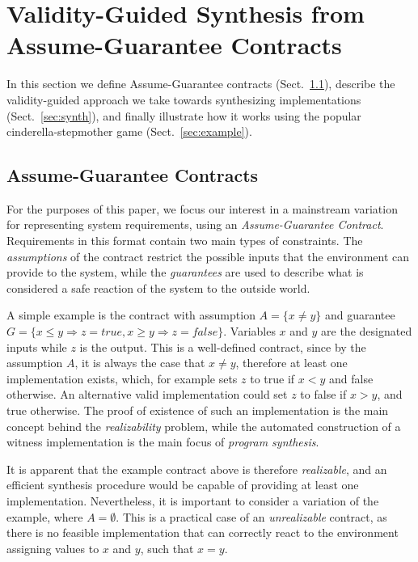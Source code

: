 \section{Validity-Guided Synthesis from Assume-Guarantee Contracts}
\label{sec:synthesis}


In this section we define Assume-Guarantee contracts (Sect.~\ref{sec:pre}),
describe the validity-guided approach we take towards synthesizing
implementations (Sect.~\ref{sec:synth}),
and finally illustrate how it works using the popular cinderella-stepmother
game (Sect.~\ref{sec:example}).

\subsection{Assume-Guarantee Contracts}
\label{sec:pre}

For the purposes of this paper, we focus our interest in a mainstream variation
for representing system requirements, using an \textit{Assume-Guarantee
Contract}. Requirements in this format contain two main types of constraints.
The \emph{assumptions} of the contract restrict the possible inputs that the
environment can provide to the system, while the \emph{guarantees} are used to
describe what is considered a safe reaction of the system to the outside world. 

A simple example is the contract with assumption $A = \{x\neq
y\}$ and guarantee $G = \{x \leq y \Rightarrow z =
\textit{true}, x \geq y \Rightarrow z = \textit{false}\}$. Variables
$x$ and $y$ are the designated inputs while $z$ is the output. This is a
well-defined contract, since by the assumption $A$, it is always the case that
$x \neq y$, therefore at least one implementation exists, which, for example
sets $z$ to true if $x < y$ and false otherwise. An alternative
valid implementation could set $z$ to false if $x > y$, and true otherwise. The
proof of existence of such an implementation is the main concept behind the
\emph{realizability} problem, while the automated construction of a witness
implementation is the main focus of \emph{program synthesis}.


It is apparent that the example contract above is therefore \emph{realizable},
and an efficient synthesis procedure would be capable of providing at least one
implementation. Nevertheless, it is important to consider a variation of the
example, where $A = \emptyset$. This is a practical case of an
\emph{unrealizable} contract, as there is no feasible implementation that can
correctly react to the environment assigning values to $x$ and $y$, such that
$x = y$.

